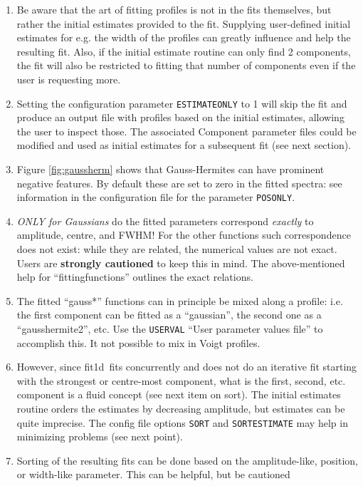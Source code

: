 \documentclass[twoside,11pt]{article}
\newcommand{\xref}[3]{#1}
\renewcommand{\_}{\texttt{\symbol{95}}}
\newcommand{\task}[1]{\textsf{#1}}
\newcommand{\fitdd}{\xref{\task{fit1d}}{sun258}{FIT1D}}
\newcommand{\aparam}[1]{\texttt{#1}}     %
\newcommand{\cparam}[1]{\texttt{#1}}     %
\begin{document}
\begin{enumerate}
\item Be aware that the art of fitting profiles is not in the fits
  themselves, but rather the initial estimates provided to the
  fit. Supplying user-defined initial estimates for e.g. the width of
  the profiles can greatly influence and help the resulting fit. Also, if
  the initial estimate routine can only find 2 components, the fit will
  also be restricted to fitting that number of components even if the
  user is requesting more.
\item Setting the configuration parameter \cparam{ESTIMATE\_ONLY} to 1
  will skip the fit and produce an output file with profiles based on the
  initial estimates, allowing the user to inspect those. The associated
  Component parameter files could be modified and used as initial estimates
  for a subsequent fit (see next section).
\item Figure \ref{fig:gaussherm} shows that Gauss-Hermites can have
  prominent negative features. By default these are set to zero in the
  fitted spectra: see information in the configuration file for the
  parameter \cparam{POS\_ONLY}.
\item {\em ONLY for Gaussians} do the fitted parameters correspond
  {\em exactly} to amplitude, centre, and FWHM! For the other functions
  such correspondence does not exist: while they are related, the
  numerical values are not exact. Users are {\bf strongly cautioned} to
  keep this in mind. The above-mentioned help for ``fitting\_functions''
  outlines the exact relations.
\item The fitted ``gauss*'' functions can in principle be mixed along a
  profile: i.e. the first component can be fitted as a ``gaussian'', the
  second one as a ``gausshermite2'', etc. Use the \aparam{USERVAL}
  ``User parameter values file'' to accomplish this. It not possible to
  mix in Voigt profiles.
\item However, since \fitdd\ fits concurrently and does not do an
  iterative fit starting with the strongest or centre-most component,
  what is the first, second, etc. component is a fluid concept
  (see next item on sort).  The initial estimates routine orders the
  estimates by decreasing amplitude, but estimates can be quite imprecise.
  The config file options \cparam{SORT} and \cparam{SORT\_ESTIMATE}
  may help in minimizing problems (see next point).
\item Sorting of the resulting fits can be done based on the amplitude-like,
  position, or width-like parameter. This can be helpful, but be cautioned

\end{enumerate}
\end{document}
